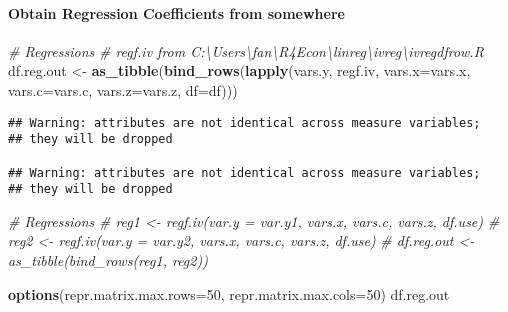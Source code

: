 \documentclass[
]{book}
\newenvironment{Shaded}{\begin{snugshade}}{\end{snugshade}}
\newcommand{\CommentTok}[1]{\textcolor[rgb]{0.56,0.35,0.01}{\textit{#1}}}
\newcommand{\DataTypeTok}[1]{\textcolor[rgb]{0.13,0.29,0.53}{#1}}
\newcommand{\DecValTok}[1]{\textcolor[rgb]{0.00,0.00,0.81}{#1}}
\newcommand{\KeywordTok}[1]{\textcolor[rgb]{0.13,0.29,0.53}{\textbf{#1}}}
\newcommand{\NormalTok}[1]{#1}
\newcommand{\StringTok}[1]{\textcolor[rgb]{0.31,0.60,0.02}{#1}}
\begin{document}
\hypertarget{obtain-regression-coefficients-from-somewhere}{%
\paragraph{Obtain Regression Coefficients from somewhere}\label{obtain-regression-coefficients-from-somewhere}}

\begin{Shaded}
\begin{Highlighting}[]
\CommentTok{# Regressions}
\CommentTok{# regf.iv from C:\textbackslash{}Users\textbackslash{}fan\textbackslash{}R4Econ\textbackslash{}linreg\textbackslash{}ivreg\textbackslash{}ivregdfrow.R}
\NormalTok{df.reg.out <-}\StringTok{ }\KeywordTok{as_tibble}\NormalTok{(}\KeywordTok{bind_rows}\NormalTok{(}\KeywordTok{lapply}\NormalTok{(vars.y, regf.iv,}
                                         \DataTypeTok{vars.x=}\NormalTok{vars.x, }\DataTypeTok{vars.c=}\NormalTok{vars.c, }\DataTypeTok{vars.z=}\NormalTok{vars.z, }\DataTypeTok{df=}\NormalTok{df)))}
\end{Highlighting}
\end{Shaded}

\begin{verbatim}
## Warning: attributes are not identical across measure variables;
## they will be dropped

## Warning: attributes are not identical across measure variables;
## they will be dropped
\end{verbatim}

\begin{Shaded}
\begin{Highlighting}[]
\CommentTok{# Regressions}
\CommentTok{# reg1 <- regf.iv(var.y = var.y1, vars.x, vars.c, vars.z, df.use)}
\CommentTok{# reg2 <- regf.iv(var.y = var.y2, vars.x, vars.c, vars.z, df.use)}
\CommentTok{# df.reg.out <- as_tibble(bind_rows(reg1, reg2))}
\end{Highlighting}
\end{Shaded}

\begin{Shaded}
\begin{Highlighting}[]
\KeywordTok{options}\NormalTok{(}\DataTypeTok{repr.matrix.max.rows=}\DecValTok{50}\NormalTok{, }\DataTypeTok{repr.matrix.max.cols=}\DecValTok{50}\NormalTok{)}
\NormalTok{df.reg.out}
\end{Highlighting}
\end{Shaded}
\end{document}

